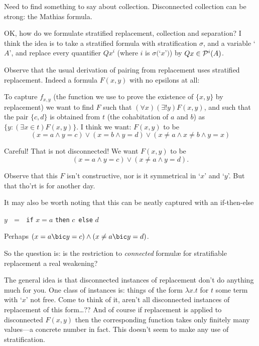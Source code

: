 \documentclass[12pt]{article}
\begin{document}
{\smallskip

Need to find something to say about collection.  Disconnected
collection can be strong: the Mathias formula.

\smallskip

OK, how do we formulate stratified replacement, collection and
separation?  I think the idea is to take a stratified formula with
stratification $\sigma$, and a variable `$A$', and replace every
quantifier $Qx^i$ (where $i$ is $\sigma($`$x$'$)$) by
$Qx \in {\cal P}^i(A)$.

\smallskip

Observe that the usual derivation of pairing from replacement uses
stratified replacement.  Indeed a formula $F(x,y)$ with no epsilons at all:

\smallskip


To capture $f_{x,y}$ (the function we use to prove the existence of
$\{x,y\}$ by replacement) we want to find $F$ such that $(\forall
x)(\exists!y)F(x,y)$, and such that the pair $\{c,d\}$ is obtained
from $t$ (the cohabitation of $a$ and $b$) as \mbox{$\{y:(\exists x
  \in t)F(x,y)\}$.} I think we want: $F(x,y)$ to be $$(x=a \wedge y
=c)\vee (x =b \wedge y = d) \vee (x\not= a \wedge x\not=b \wedge y
=x)$$

\smallskip

Careful!  That is not disconnected!  We want $F(x,y)$ to be
$$(x=a \wedge y =c)\vee (x \not= a \wedge y = d).$$

\smallskip



Observe that this $F$ isn't constructive, nor is it symmetrical in
  `$x$' and `$y$'.  But that tho'rt is for another day.

It may also be worth noting that this can be neatly captured with an
if-then-else

\mbox{$y$\,  $=$\,  }{\tt if}\mbox{$\, \, x  = a\, \, $}{\tt then}\mbox{$\, \, c\, \, \, $}{\tt else}$\, \, d$



Perhaps $(x=a \bic y =c) \wedge (x \not= a \bic y = d)$.

So the question is: is the restriction to {\sl connected}
formul{\ae} for stratifiable replacement a real weakening?

The general idea is that disconnected instances of replacement don't
do anything much for you. One class of instances is: things of the
form $\lambda x.t$ for $t$ some term with `$x$' not free.  Come to
think of it, aren't all disconnected instances of replacement of this
form\ldots??  And of course if replacement is applied to disconnected
$F(x,y)$ then the corresponding function takes only finitely many
values---a concrete number in fact.  This doesn't seem to make any use
of stratification.

}
\end{document}
